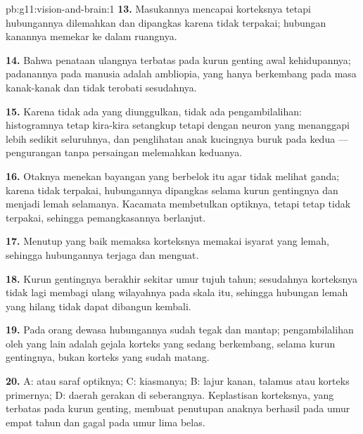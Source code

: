 \begin{solution}{pb:g11:vision-and-brain:1}
\textbf{13.} Masukannya mencapai korteksnya tetapi hubungannya
dilemahkan dan dipangkas karena tidak terpakai; hubungan  kanannya
memekar ke dalam ruangnya.

\textbf{14.} Bahwa penataan ulangnya terbatas pada kurun genting awal
kehidupannya; padanannya pada manusia adalah ambliopia, yang hanya
berkembang pada masa kanak-kanak dan tidak terobati sesudahnya.

\textbf{15.} Karena tidak ada  yang diunggulkan, tidak ada
pengambilalihan: histogramnya tetap kira-kira setangkup tetapi dengan
neuron yang menanggapi lebih sedikit seluruhnya, dan penglihatan anak
kucingnya buruk pada kedua  --- pengurangan tanpa persaingan
melemahkan keduanya.

\textbf{16.} Otaknya menekan bayangan  yang berbelok itu agar tidak
melihat ganda; karena tidak terpakai, hubungannya dipangkas selama
kurun gentingnya dan  menjadi lemah selamanya. Kacamata
membetulkan optiknya, tetapi  tetap tidak terpakai, sehingga
pemangkasannya berlanjut.

\textbf{17.} Menutup  yang baik memaksa korteksnya memakai isyarat
 yang lemah, sehingga hubungannya terjaga dan menguat.

\textbf{18.} Kurun gentingnya berakhir sekitar umur tujuh tahun;
sesudahnya korteksnya tidak lagi membagi ulang wilayahnya pada skala
itu, sehingga hubungan  lemah yang hilang tidak dapat dibangun kembali.

\textbf{19.} Pada orang dewasa hubungannya sudah tegak dan mantap;
pengambilalihan oleh  yang lain adalah gejala korteks yang sedang
berkembang, selama kurun gentingnya, bukan korteks yang sudah matang.

\textbf{20.} A:  atau saraf optiknya; C: kiasmanya; B: lajur
kanan, talamus atau korteks primernya; D: daerah gerakan di seberangnya.
Keplastisan korteksnya, yang terbatas pada kurun genting, membuat
penutupan  anaknya berhasil pada umur empat tahun dan gagal pada
umur lima belas.
\end{solution}
